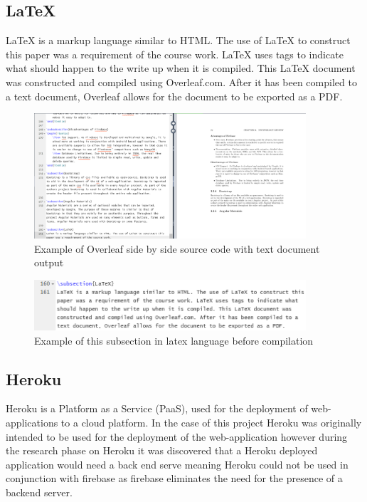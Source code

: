 \subsection{LaTeX}
LaTeX is a markup language similar to HTML. The use of LaTeX to construct this paper was a requirement of the course work. LaTeX uses tags to indicate what should happen to the write up when it is compiled. This LaTeX document was constructed and compiled using Overleaf.com. After it has been compiled to a text document, Overleaf allows for the document to be exported as a PDF. 

\begin{figure}[h!]
    	\caption{Example of Overleaf side by side source code with text document output}
	\centering
	\includegraphics[width=0.9\textwidth]{images/overleaf.png}
\end{figure}

\begin{figure}[h!]
    	\caption{Example of this subsection in latex language before compilation}
	\centering
	\includegraphics[width=0.9\textwidth]{images/latex.png}
\end{figure}

\newpage

\subsection{Heroku}
Heroku is a Platform as a Service (PaaS), used for the deployment of web-applications to a cloud platform. In the case of this project Heroku was originally intended to be used for the deployment of the web-application however during the research phase on Heroku it was discovered that a Heroku deployed application would need a back end serve meaning Heroku could not be used in conjunction with firebase as firebase eliminates the need for the presence of a backend server.









